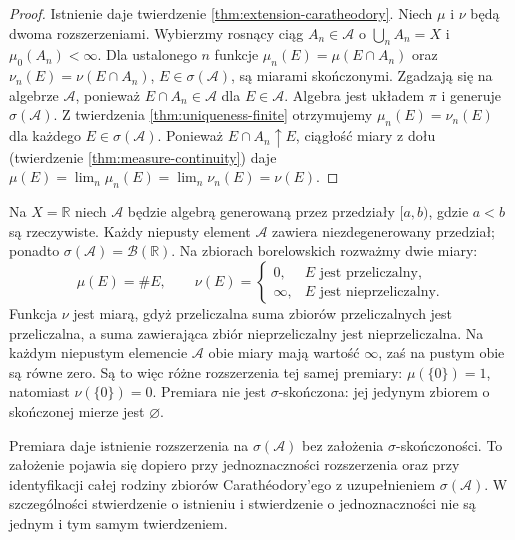 \begin{proof}
Istnienie daje twierdzenie \ref{thm:extension-caratheodory}.
Niech $\mu$ i $\nu$ będą dwoma rozszerzeniami.
Wybierzmy rosnący ciąg $A_n\in\mathcal A$ o
$\bigcup_n A_n=X$ i $\mu_0(A_n)<\infty$.
Dla ustalonego $n$ funkcje
$\mu_n(E)=\mu(E\cap A_n)$ oraz $\nu_n(E)=\nu(E\cap A_n)$,
$E\in\sigma(\mathcal A)$, są miarami skończonymi.
Zgadzają się na algebrze $\mathcal A$, ponieważ
$E\cap A_n\in\mathcal A$ dla $E\in\mathcal A$.
Algebra jest układem $\pi$ i generuje
$\sigma(\mathcal A)$. Z twierdzenia
\ref{thm:uniqueness-finite} otrzymujemy
$\mu_n(E)=\nu_n(E)$ dla każdego $E\in\sigma(\mathcal A)$.
Ponieważ $E\cap A_n\uparrow E$, ciągłość miary z dołu
(twierdzenie \ref{thm:measure-continuity}) daje
$\mu(E)=\lim_n\mu_n(E)=\lim_n\nu_n(E)=\nu(E)$.
\end{proof}

\begin{przyklad}
\label{ex:nonunique-extension}
Na $X=\mathbb R$ niech $\mathcal A$ będzie algebrą
generowaną przez przedziały $[a,b)$, gdzie $a<b$ są
rzeczywiste. Każdy niepusty element $\mathcal A$ zawiera
niezdegenerowany przedział; ponadto
$\sigma(\mathcal A)=\mathcal B(\mathbb R)$.
Na zbiorach borelowskich rozważmy dwie miary:
\[
\mu(E)=\#E,\qquad
\nu(E)=\begin{cases}0,&E\text{ jest przeliczalny},\\
\infty,&E\text{ jest nieprzeliczalny}.
\end{cases}
\]
Funkcja $\nu$ jest miarą, gdyż przeliczalna suma zbiorów
przeliczalnych jest przeliczalna, a suma zawierająca
zbiór nieprzeliczalny jest nieprzeliczalna. Na każdym
niepustym elemencie $\mathcal A$ obie miary mają wartość
$\infty$, zaś na pustym obie są równe zero. Są to więc
różne rozszerzenia tej samej premiary:
$\mu(\{0\})=1$, natomiast $\nu(\{0\})=0$.
Premiara nie jest $\sigma$-skończona: jej jedynym
zbiorem o skończonej mierze jest $\varnothing$.
\end{przyklad}

\begin{uwaga}
Premiara daje istnienie rozszerzenia na $\sigma(\mathcal A)$
bez założenia $\sigma$-skończoności. To założenie pojawia się
dopiero przy jednoznaczności rozszerzenia oraz przy
identyfikacji całej rodziny zbiorów Carathéodory'ego
z uzupełnieniem $\sigma(\mathcal A)$. W szczególności
stwierdzenie o istnieniu i stwierdzenie o jednoznaczności
nie są jednym i tym samym twierdzeniem.
\end{uwaga}

